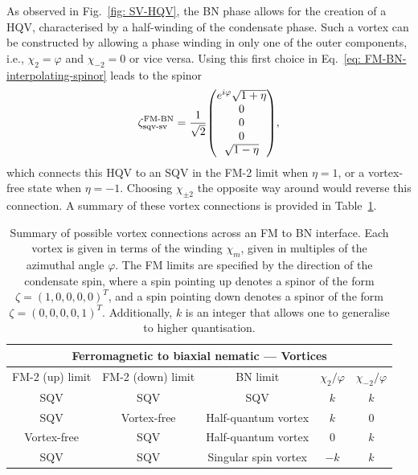 As observed in Fig.~\ref{fig: SV-HQV}, the BN phase allows for the creation
of a HQV, characterised by a half-winding of the condensate phase.
Such a vortex can be constructed by allowing a phase winding in only one of the
outer components, i.e., \(\chi_2 = \varphi \) and \(\chi_{-2} = 0\) or vice
versa.
Using this first choice in Eq.~\eqref{eq: FM-BN-interpolating-spinor} leads to
the spinor
\begin{align}\label{eq: FM-BN-sqv-hqv}
    \zeta^\text{FM-BN}_\text{sqv-sv} = \frac{1}{\sqrt{2}}\mqty(
    e^{i\varphi} \sqrt{1 + \eta} \\
    0 \\
    0 \\
    0 \\
    \sqrt{1 - \eta}),
\end{align}
which connects this HQV to an SQV in the FM-2 limit when \(\eta = 1\), or a
vortex-free state when \(\eta = -1\).
Choosing \(\chi_{\pm 2}\) the opposite way around would reverse this connection.
A summary of these vortex connections is provided in
Table~\ref{tab: FM-BN-vortices}.
\begin{table}
    \centering
    \begin{tabular}{ccccc}
        \toprule
        \multicolumn{5}{c}{Ferromagnetic to biaxial nematic --- Vortices} \\
        \midrule
        FM-2 (up) limit & FM-2 (down) limit & BN limit &  \(\chi_2/\varphi \)
        & \(\chi_{-2}/\varphi \)  \\
        \midrule
         SQV & SQV & SQV & \(k\) & \(k\) \\ 
         SQV & Vortex-free & Half-quantum vortex & \(k\) & 0 \\
         Vortex-free & SQV & Half-quantum vortex & 0 & \(k\) \\
         SQV & SQV & Singular spin vortex  & \(-k\) & \(k\) \\
        \bottomrule
    \end{tabular}
    \caption{\label{tab: FM-BN-vortices}
    Summary of possible vortex connections across an FM to BN interface.
    Each vortex is given in terms of the winding \(\chi_m\), given in multiples
    of the azimuthal angle \(\varphi \).
    The FM limits are specified by the direction of the condensate spin, where
    a spin pointing up denotes a spinor of the form
    \(\zeta={(1, 0, 0, 0, 0)}^T\), and a spin pointing down denotes a spinor of
    the form \(\zeta={(0, 0, 0, 0, 1)}^T\).
    Additionally, \(k\) is an integer that allows one to generalise to higher
    quantisation.}
\end{table}


